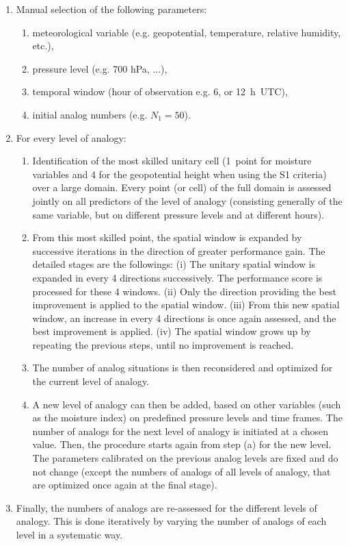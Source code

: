 \documentclass[review]{elsarticle}
\begin{document}
\begin{enumerate}
	\item Manual selection of the following parameters:
	\begin{enumerate}
		\item meteorological variable (e.g. geopotential, temperature, relative humidity, etc.),
		\item pressure level (e.g. 700 hPa, ...),
		\item temporal window (hour of observation \textendash e.g. 6, or 12~h~UTC),
		\item initial analog numbers (e.g. $N_{1}=50$).
	\end{enumerate}
	
	\item For every level of analogy:
	\begin{enumerate}
		\item Identification of the most skilled unitary cell (1~point for moisture variables and 4 for the geopotential height when using the S1 criteria) over a large domain. Every point (or cell) of the full domain is assessed jointly on all predictors of the level of analogy (consisting generally of the same variable, but on different pressure levels and at different hours).
		\item From this most skilled point, the spatial window is expanded by successive iterations in the direction of greater performance gain. The detailed stages are the followings: (i) The unitary spatial window is expanded in every 4 directions successively. The performance score is processed for these 4 windows. (ii) Only the direction providing the best improvement is applied to the spatial window. (iii) From this new spatial window, an increase in every 4 directions is once again assessed, and the best improvement is applied. (iv) The spatial window grows up by repeating the previous steps, until no improvement is reached.
		\item The number of analog situations is then reconsidered and optimized for the current level of analogy.
		\item A new level of analogy can then be added, based on other variables (such as the moisture index) on predefined pressure levels and time frames. The number of analogs for the next level of analogy is initiated at a chosen value. Then, the procedure starts again from step (a) for the new level. The parameters calibrated on the previous analog levels are fixed and do not change (except the numbers of analogs of all levels of analogy, that are optimized once again at the final stage). 
	\end{enumerate}
	\item Finally, the numbers of analogs are re-assessed for the different levels of analogy. This is done iteratively by varying the number of analogs of each level in a systematic way.
\end{enumerate}
\end{document}
